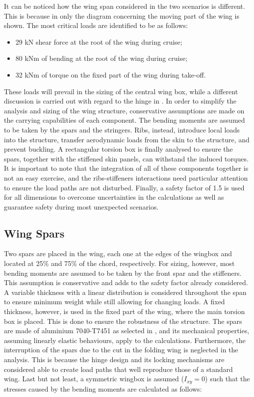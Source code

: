 It can be noticed how the wing span considered in the two scenarios is different.
This is because in  only the diagram concerning the moving part of the wing is shown.
The most critical loads are identified to be as follows:
\begin{itemize}
    \item 29 kN shear force at the root of the wing during cruise;
    \item 80 kNm of bending at the root of the wing during cruise;
    \item 32 kNm of torque on the fixed part of the wing during take-off.
\end{itemize}
These loads will prevail in the sizing of the central wing box, while a different discussion is carried out with regard to the hinge in .
In order to simplify the analysis and sizing of the wing structure, conservative assumptions are made on the carrying capabilities of each component.
The bending moments are assumed to be taken by the spars and the stringers.
Ribs, instead, introduce local loads into the structure, transfer aerodynamic loads from the skin to the structure, and prevent buckling.
A rectangular torsion box is finally analysed to ensure the spars, together with the stiffened skin panels, can withstand the induced torques.
It is important to note that the integration of all of these components together is not an easy exercise, and the ribs-stiffeners interactions need particular attention to ensure the load paths are not disturbed.
Finally, a safety factor of 1.5 is used for all dimensions to overcome uncertainties in the calculations as well as guarantee safety during most unexpected scenarios.

\subsection{Wing Spars}
\label{sec:wingspar}
Two spars are placed in the wing, each one at the edges of the wingbox and located at 25\% and 75\% of the chord, respectively.
For sizing, however, most bending moments are assumed to be taken by the front spar and the stiffeners.
This assumption is conservative and adds to the safety factor already considered.
A variable thickness with a linear distribution is considered throughout the span to ensure minimum weight while still allowing for changing loads.
A fixed thickness, however, is used in the fixed part of the wing, where the main torsion box is placed.
This is done to ensure the robustness of the structure.
The spars are made of aluminium 7040-T7451 as selected in , and its mechanical properties, assuming linearly elastic behaviours, apply to the calculations.
Furthermore, the interruption of the spars due to the cut in the folding wing is neglected in the analysis.
This is because the hinge design and its locking mechanisms are considered able to create load paths that well reproduce those of a standard wing.
Last but not least, a symmetric wingbox is assumed ($I_{xy} = 0$) such that the stresses caused by the bending moments are calculated as follows:

